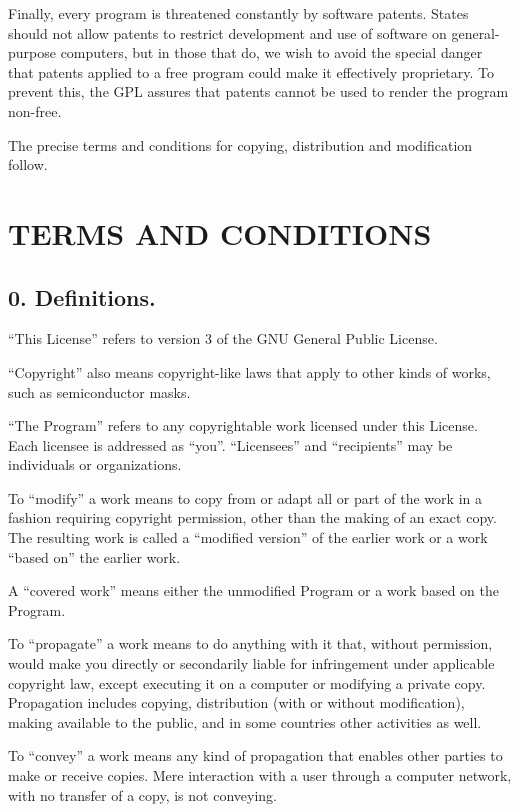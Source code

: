 \documentclass[letterpaper,10pt,english]{sphinxmanual}
\begin{document}
Finally, every program is threatened constantly by software patents.
States should not allow patents to restrict development and use of
software on general-purpose computers, but in those that do, we wish to
avoid the special danger that patents applied to a free program could
make it effectively proprietary.  To prevent this, the GPL assures that
patents cannot be used to render the program non-free.

The precise terms and conditions for copying, distribution and
modification follow.


\section{TERMS AND CONDITIONS}
\label{license:terms-and-conditions}

\subsection{0. Definitions.}
\label{license:definitions}
``This License'' refers to version 3 of the GNU General Public License.

``Copyright'' also means copyright-like laws that apply to other kinds of
works, such as semiconductor masks.

``The Program'' refers to any copyrightable work licensed under this
License.  Each licensee is addressed as ``you''.  ``Licensees'' and
``recipients'' may be individuals or organizations.

To ``modify'' a work means to copy from or adapt all or part of the work
in a fashion requiring copyright permission, other than the making of an
exact copy.  The resulting work is called a ``modified version'' of the
earlier work or a work ``based on'' the earlier work.

A ``covered work'' means either the unmodified Program or a work based
on the Program.

To ``propagate'' a work means to do anything with it that, without
permission, would make you directly or secondarily liable for
infringement under applicable copyright law, except executing it on a
computer or modifying a private copy.  Propagation includes copying,
distribution (with or without modification), making available to the
public, and in some countries other activities as well.

To ``convey'' a work means any kind of propagation that enables other
parties to make or receive copies.  Mere interaction with a user through
a computer network, with no transfer of a copy, is not conveying.
\end{document}

